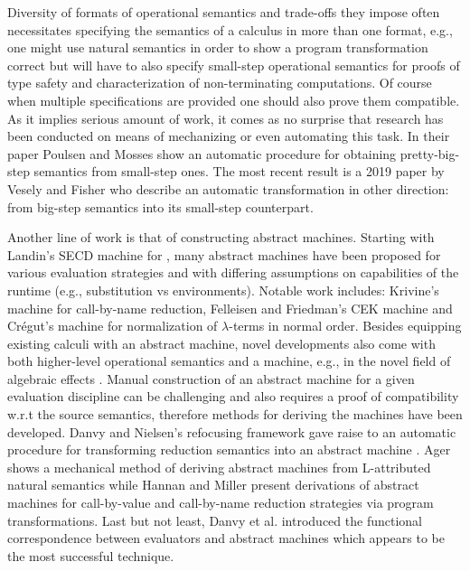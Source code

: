 Diversity of formats of operational semantics and trade-offs they impose often necessitates specifying the semantics of a calculus in more than one format, e.g., one might use natural semantics in order to show a program transformation correct but will have to also specify small-step operational semantics for proofs of type safety and characterization of non-terminating computations.
Of course when multiple specifications are provided one should also prove them compatible.
As it implies serious amount of work, it comes as no surprise that research has been conducted on means of mechanizing or even automating this task.
In their paper \cite{poulsen-deriving-pretty-big-step} Poulsen and Mosses show an automatic procedure for obtaining pretty-big-step semantics from small-step ones.
The most recent result is a 2019 paper by Vesely and Fisher \cite{one-step-at-a-time} who describe an automatic transformation in other direction: from big-step semantics into its small-step counterpart.

Another line of work is that of constructing abstract machines.
Starting with Landin's SECD machine \cite{landin-secd} for \LC{}, many abstract machines have been proposed for various evaluation strategies and with differing assumptions on capabilities of the runtime (e.g., substitution vs environments).
Notable work includes: Krivine's machine \cite{krivine-machine} for call-by-name reduction, Felleisen and Friedman's CEK machine \cite{felleisen-cek} and Cr\'{e}gut's machine \cite{cregut-normal} for normalization of $\lambda$-terms in normal order.
Besides equipping existing calculi with an abstract machine, novel developments also come with both higher-level operational semantics and a machine, e.g., in the novel field of algebraic effects \cite{biernacki-algebraic-effects,hillerstrom-algebraic-effects}.
Manual construction of an abstract machine for a given evaluation discipline can be challenging and also requires a proof of compatibility w.r.t the source semantics, therefore methods for deriving the machines have been developed.
Danvy and Nielsen's refocusing framework \cite{refocusing} gave raise to an automatic procedure for transforming reduction semantics into an abstract machine \cite{refocusing-auto,refocusing-generalized}.
Ager shows a mechanical method of deriving abstract machines from L-attributed natural semantics \cite{ager-natural-semantics} while Hannan and Miller present derivations of abstract machines for call-by-value and call-by-name reduction strategies \cite{hannan-big-step-to-am} via program transformations.
Last but not least, Danvy et al. introduced the functional correspondence between evaluators and abstract machines \cite{functional-correspondence} which appears to be the most successful technique.

